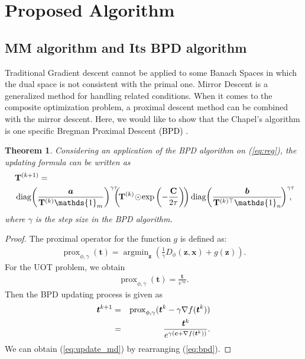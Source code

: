 \documentclass[conference]{IEEEtran}
\newtheorem{thm}{Theorem}
\newcommand{\one}{\mathds{1}}
\newcommand{\mat}[1]{\mathbf{#1}}
\renewcommand{\vec}[1]{\bm{#1}}
\newcommand{\prox}{\operatorname{prox}}
\newcommand{\argmin}{\operatorname{argmin}}
\newcommand{\changeHK}[1]{\textcolor{black}{#1}}
\newcommand{\changeSX}[1]{\textcolor{black}{#1}}
\begin{document}
\section{Proposed Algorithm}
\subsection{MM algorithm and Its BPD algorithm}
Traditional Gradient descent cannot be applied to some Banach Spaces in which the dual space is not consistent with the primal one. Mirror Descent \cite{doi:10.1137/1027074, BECK2003167} is a generalized method for handling related conditions. When it comes to the composite optimization problem, a proximal descent method can be combined with the mirror descent. Here, we would like to show that the Chapel's algorithm is one specific Bregman Proximal Descent \changeSX{(BPD)} \cite{DBLP:journals/coap/HanzelyRX21}.


\begin{thm}
Considering an application of the BPD algorithm on (\ref{eq:reg}), the updating formula can be written as
\begin{align}
\label{eq:update_md}
&\mat{T}^{(k+1)}=\notag\\
&\operatorname{diag}\!\left(\frac{\vec a}{\mat{T}^{(k)} \one_m}\right)^{\gamma\tau}\!\!\!\!\left(\!\mat{T}^{(k)} \!\odot\! \exp \left(-\frac{\mat C}{2 \tau}\right)\!\right)
\operatorname{diag}\!\left(\frac{\vec{b}}{\mat{T}^{(k) \top} \one_n}\!\right)^{{\gamma\tau}}\!\!\!\!\!,\notag\\
\end{align}
where $\gamma$ is the step size in the BPD algorithm\changeHK{.}
\end{thm}
\begin{proof}
The proximal operator for the function $g$ is defined as:
\begin{align*}
\prox_{\phi,\gamma}(\vec t) = \argmin_{\vec z}{\left(\frac{1}{\gamma}D_\phi(\vec z,\vec x)+g(\vec z)\right)}.
\end{align*}
For the UOT problem, we obtain
\begin{align*}
\prox_{\phi,\gamma}(\vec t) = \frac{\vec t}{e^{{\gamma \vec c}}}.
\end{align*}
Then the BPD updating process is given as
\begin{eqnarray}
\label{eq:bpd}
\vec t^{k+1} &=& \prox_{\phi,\gamma}(\vec{t}^{k} - \gamma \nabla f(\vec t^{k})) \notag\\
&=& \frac{\vec{t}^{k}}{e^{\gamma ({\vec c + \nabla f(\vec t^{k})})}}.
\end{eqnarray}
We can obtain (\ref{eq:update_md}) by rearranging (\ref{eq:bpd}).
\end{proof}
\end{document}
